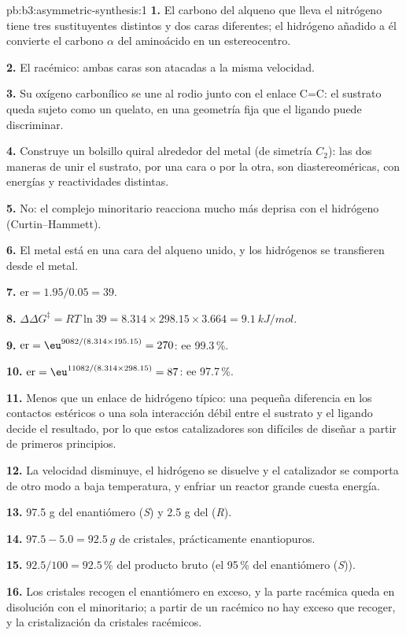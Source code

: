 \begin{solution}{pb:b3:asymmetric-synthesis:1}
\textbf{1.} El carbono del alqueno que lleva el nitrógeno tiene tres sustituyentes distintos
y dos caras diferentes; el hidrógeno añadido a él convierte el carbono $\alpha$ del
aminoácido en un estereocentro.

\textbf{2.} El racémico: ambas caras son atacadas a la misma velocidad.

\textbf{3.} Su oxígeno carbonílico se une al rodio junto con el enlace C=C: el sustrato queda
sujeto como un quelato, en una geometría fija que el ligando puede discriminar.

\textbf{4.} Construye un bolsillo quiral alrededor del metal (de simetría $C_2$): las dos maneras de
unir el sustrato, por una cara o por la otra, son diastereoméricas, con energías y
reactividades distintas.

\textbf{5.} No: el complejo minoritario reacciona mucho más deprisa con el hidrógeno (Curtin--Hammett).

\textbf{6.} El metal está en una cara del alqueno unido, y los hidrógenos se
transfieren desde el metal.

\textbf{7.} $\mathrm{er} = 1.95/0.05 = 39$.

\textbf{8.} $\Delta\Delta G^\ddagger = RT\ln 39 = 8.314 \times 298.15 \times 3.664 = \qty{9.1}{kJ/mol}$.

\textbf{9.} $\mathrm{er} = \eu^{9082/(8.314 \times 195.15)} = 270$: ee 99.3\,\%.

\textbf{10.} $\mathrm{er} = \eu^{11082/(8.314 \times 298.15)} = 87$: ee 97.7\,\%.

\textbf{11.} Menos que un enlace de hidrógeno típico: una pequeña diferencia en los contactos
estéricos o una sola interacción débil entre el sustrato y el ligando decide el
resultado, por lo que estos catalizadores son difíciles de diseñar a partir de primeros principios.

\textbf{12.} La velocidad disminuye, el hidrógeno se disuelve y el catalizador se comporta de otro modo
a baja temperatura, y enfriar un reactor grande cuesta energía.

\textbf{13.} 97.5 g del enantiómero (\textit{S}) y 2.5 g del (\textit{R}).

\textbf{14.} $97.5 - 5.0 = \qty{92.5}{g}$ de cristales, prácticamente enantiopuros.

\textbf{15.} $92.5/100 = 92.5$\,\% del producto bruto (el 95\,\% del enantiómero (\textit{S})).

\textbf{16.} Los cristales recogen el enantiómero en exceso, y la parte racémica queda en
disolución con el minoritario; a partir de un racémico no hay exceso que recoger, y la
cristalización da cristales racémicos.


\end{solution}

